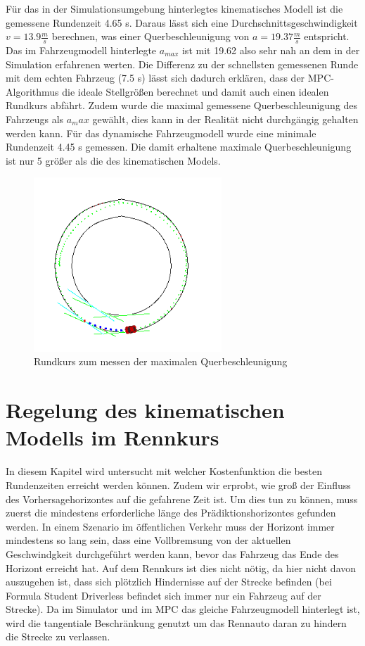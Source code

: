 \documentclass{like}
\begin{document}
Für das in der Simulationsumgebung hinterlegtes kinematisches Modell ist die gemessene Rundenzeit 4.65 s. Daraus lässt sich eine Durchschnittsgeschwindigkeit $ v= 13.9 \frac{m}{s}$ berechnen, was einer Querbeschleunigung von $a = 19.37 \frac{m}{s}$ entspricht. Das im Fahrzeugmodell hinterlegte $a_{max}$ ist mit 19.62  also sehr nah an dem in der Simulation erfahrenen werten. Die Differenz zu der schnellsten gemessenen Runde mit dem echten Fahrzeug (7.5 s) lässt sich dadurch erklären, dass der MPC-Algorithmus die ideale Stellgrößen berechnet und damit auch einen idealen Rundkurs abfährt. Zudem wurde die maximal gemessene Querbeschleunigung des Fahrzeugs als $a_max$ gewählt, dies kann in der Realität nicht durchgängig gehalten werden kann.
Für das dynamische Fahrzeugmodell wurde eine minimale Rundenzeit 4.45 s gemessen.  Die damit erhaltene maximale Querbeschleunigung ist nur 5  größer als die des kinematischen Models.  

\begin{figure}
	\centering
	\includegraphics[width=200pt]{Abbildungen/roundCourse.png}
	\caption{Rundkurs zum messen der maximalen Querbeschleunigung}
	\label{fig:roundCourse}
\end{figure}


\section{Regelung des kinematischen Modells im Rennkurs}
In diesem Kapitel wird untersucht mit welcher Kostenfunktion die besten Rundenzeiten erreicht werden können. Zudem wir erprobt, wie groß der Einfluss des Vorhersagehorizontes auf die gefahrene Zeit ist. Um dies tun zu können, muss zuerst die mindestens erforderliche länge des Prädiktionshorizontes gefunden werden. In einem Szenario im öffentlichen Verkehr muss der Horizont immer mindestens so lang sein, dass eine Vollbremsung von der aktuellen Geschwindgkeit durchgeführt werden kann, bevor das Fahrzeug das Ende des Horizont erreicht hat. Auf dem Rennkurs ist dies nicht nötig, da hier nicht davon auszugehen ist, dass sich plötzlich Hindernisse auf der Strecke befinden (bei Formula Student Driverless befindet sich immer nur ein Fahrzeug auf der Strecke). Da im Simulator und im \ac{MPC} das gleiche Fahrzeugmodell hinterlegt ist, wird die tangentiale Beschränkung genutzt um das Rennauto daran zu hindern die Strecke zu verlassen.
\end{document}
